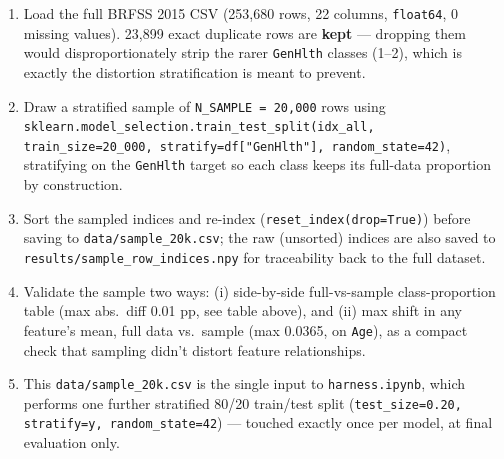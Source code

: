 \documentclass[11pt]{article}
\newcommand{\code}[1]{\texttt{#1}}
\begin{document}
\begin{enumerate}
    \item Load the full BRFSS 2015 CSV (253,680 rows, 22 columns, \code{float64}, 0 missing values). 23,899 exact duplicate rows are \textbf{kept} --- dropping them would disproportionately strip the rarer \code{GenHlth} classes (1--2), which is exactly the distortion stratification is meant to prevent.
    \item Draw a stratified sample of \code{N\_SAMPLE = 20,000} rows using \code{sklearn.model\_selection.train\_test\_split(idx\_all, train\_size=20\_000, stratify=df["GenHlth"], random\_state=42)}, stratifying on the \code{GenHlth} target so each class keeps its full-data proportion by construction.
    \item Sort the sampled indices and re-index (\code{reset\_index(drop=True)}) before saving to \code{data/sample\_20k.csv}; the raw (unsorted) indices are also saved to \code{results/sample\_row\_indices.npy} for traceability back to the full dataset.
    \item Validate the sample two ways: (i) side-by-side full-vs-sample class-proportion table (max abs.\ diff 0.01 pp, see table above), and (ii) max shift in any feature's mean, full data vs.\ sample (max 0.0365, on \code{Age}), as a compact check that sampling didn't distort feature relationships.
    \item This \code{data/sample\_20k.csv} is the single input to \code{harness.ipynb}, which performs one further stratified 80/20 train/test split (\code{test\_size=0.20, stratify=y, random\_state=42}) --- touched exactly once per model, at final evaluation only.
\end{enumerate}
\end{document}
